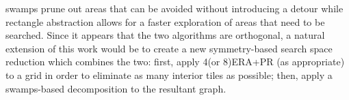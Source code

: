 swamps prune out areas that can be avoided without introducing a detour while 
rectangle abstraction allows for a faster exploration of areas that need to be searched.
Since it appears that the two algorithms are orthogonal, a natural extension of this work would 
be to create a new symmetry-based search space reduction which combines the two: 
first, apply 4(or 8)ERA+PR (as appropriate) to a grid in order to eliminate as many interior tiles 
as possible; then, apply a swamps-based decomposition to the resultant graph.

